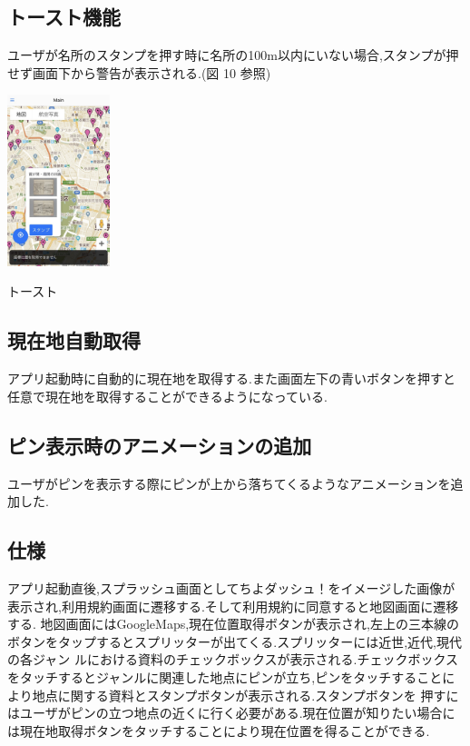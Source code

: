 \documentclass[a4paper, twoside]{jarticle}
\makeatletter
\newenvironment{figurehere}
  {\def\@captype{figure}}
  {}
\makeatother
\begin{document}
\begin{multicols}{2}
\subsection{トースト機能}
ユーザが名所のスタンプを押す時に名所の100m以内にいない場合,スタンプが押せず画面下から警告が表示される.(図 10 参照)
\begin{figurehere}
\begin{center}
\includegraphics[bb=30 50 550 1300,width=3cm]{./image11.jpg}%
\end{center}
\caption{トースト}\label{fig:11}
\end{figurehere}

\subsection{現在地自動取得}
アプリ起動時に自動的に現在地を取得する.また画面左下の青いボタンを押すと任意で現在地を取得することができるようになっている.

\subsection{ピン表示時のアニメーションの追加}
ユーザがピンを表示する際にピンが上から落ちてくるようなアニメーションを追加した.

\subsection{仕様}
アプリ起動直後,スプラッシュ画面としてちよダッシュ！をイメージした画像が表示され,利用規約画面に遷移する.そして利用規約に同意すると地図画面に遷移する.
地図画面にはGoogleMaps,現在位置取得ボタンが表示され,左上の三本線のボタンをタップするとスプリッターが出てくる.スプリッターには近世,近代,現代の各ジャン
ルにおける資料のチェックボックスが表示される.チェックボックスをタッチするとジャンルに関連した地点にピンが立ち,ピンをタッチすることにより地点に関する資料とスタンプボタンが表示される.スタンプボタンを
押すにはユーザがピンの立つ地点の近くに行く必要がある.現在位置が知りたい場合には現在地取得ボタンをタッチすることにより現在位置を得ることができる.


\end{multicols}
\end{document}

